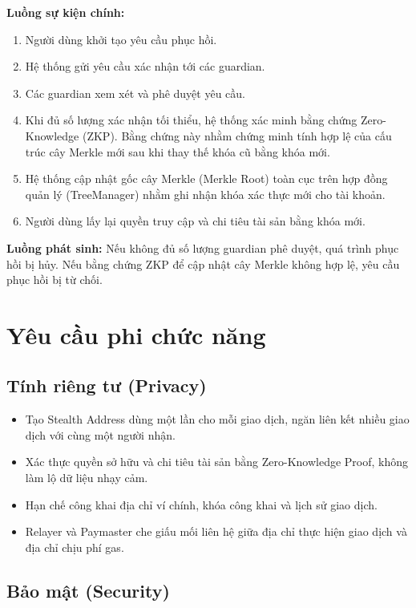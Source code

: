 \documentclass[../DoAn.tex]{subfiles}
\begin{document}
\textbf{Luồng sự kiện chính:}

\begin{enumerate}
    \item Người dùng khởi tạo yêu cầu phục hồi.
    \item Hệ thống gửi yêu cầu xác nhận tới các guardian.
    \item Các guardian xem xét và phê duyệt yêu cầu.
    \item Khi đủ số lượng xác nhận tối thiểu, hệ thống xác minh bằng chứng Zero-Knowledge (ZKP). Bằng chứng này nhằm chứng minh tính hợp lệ của cấu trúc cây Merkle mới sau khi thay thế khóa cũ bằng khóa mới.
    \item Hệ thống cập nhật gốc cây Merkle (Merkle Root) toàn cục trên hợp đồng quản lý (TreeManager) nhằm ghi nhận khóa xác thực mới cho tài khoản.
    \item Người dùng lấy lại quyền truy cập và chi tiêu tài sản bằng khóa mới.
\end{enumerate}

\textbf{Luồng phát sinh:} Nếu không đủ số lượng guardian phê duyệt, quá trình phục hồi bị hủy. Nếu bằng chứng ZKP để cập nhật cây Merkle không hợp lệ, yêu cầu phục hồi bị từ chối.


\section{Yêu cầu phi chức năng}
\label{section:2.4}

\subsection{Tính riêng tư (Privacy)}

\begin{itemize}
\item Tạo Stealth Address dùng một lần cho mỗi giao dịch, ngăn liên kết nhiều giao dịch với cùng một người nhận.
\item Xác thực quyền sở hữu và chi tiêu tài sản bằng Zero-Knowledge Proof, không làm lộ dữ liệu nhạy cảm.
\item Hạn chế công khai địa chỉ ví chính, khóa công khai và lịch sử giao dịch.
\item Relayer và Paymaster che giấu mối liên hệ giữa địa chỉ thực hiện giao dịch và địa chỉ chịu phí gas.
\end{itemize}

\subsection{Bảo mật (Security)}
\end{document}
